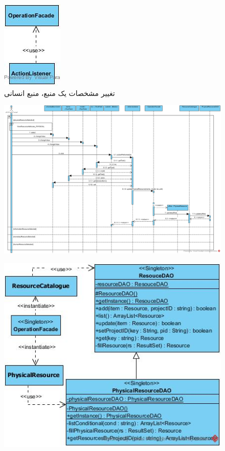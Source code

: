 \begin{landscape}
\begin{figure}[H]
	\includegraphics[scale=0.6]{img/sequence-design/EditResourceAttributes_HUMANUI}
	\caption{تغییر مشخصات یک منبع، منبع انسانی}
\end{figure}
\begin{figure}[H]
	\centering
	\includegraphics[scale=0.6]{img/sequence-design/EditResourceAttributes_PHYSICAL}
\end{figure}
\begin{figure}[H]
	\centering
	\includegraphics[scale=0.6]{img/sequence-design/EditResourceAttributes_PHYSICALC}

\end{figure}
\end{landscape}
